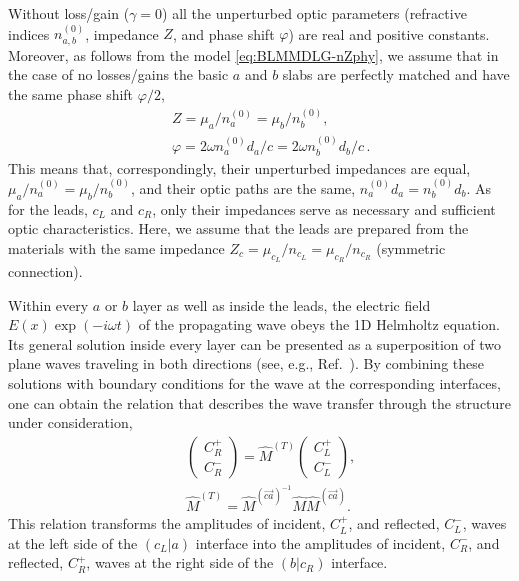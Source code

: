 \documentclass[aps,pra,reprint,showpacs,bibnotes,preprintnumbers,twoside,eqsecnum]{revtex4-1}
\begin{document}
Without loss/gain ($\gamma=0$) all the unperturbed optic parameters (refractive indices $n_{a,b}^{(0)}$, impedance $Z$, and phase shift $\varphi$) are real and positive constants. Moreover, as follows from the model \eqref{eq:BLMMDLG-nZphy}, we assume that in the case of no losses/gains the basic $a$ and $b$ slabs are perfectly matched and have the same phase shift $\varphi/2$,
%
\begin{subequations}\label{eq:MQS-def}
\begin{eqnarray}
&&Z=\mu_a/n_a^{(0)}=\mu_b/n_b^{(0)},\qquad\label{eq:MQS-Z}\\[6pt]
&&\varphi=2\omega n_a^{(0)}d_a/c=2\omega n_b^{(0)}d_b/c\,.\label{eq:MQS-phi}
\end{eqnarray}
\end{subequations}
This means that, correspondingly, their unperturbed impedances are equal, $\mu_a/n_a^{(0)}=\mu_b/n_b^{(0)}$, and their optic paths are the same, $n_a^{(0)}d_a=n_b^{(0)}d_b$. As for the leads, $c_L$ and $c_R$, only their impedances serve as necessary and sufficient optic characteristics. Here, we assume that the leads are prepared from the materials with the same impedance $Z_{c}=\mu_{c_L}/n_{c_L}=\mu_{c_R}/n_{c_R}$ (symmetric connection).

Within every $a$ or $b$ layer as well as inside the leads, the electric field $E(x)\exp(-i\omega t)$ of the propagating wave obeys the 1D Helmholtz equation. Its general solution inside every layer can be presented as a superposition of two plane waves traveling in both directions (see, e.g., Ref.~\cite{IKM12}). By combining these solutions with boundary conditions for the wave at the corresponding interfaces, one can obtain the relation that describes the wave transfer through the structure under consideration,
%
\begin{eqnarray}\label{eq:TotalTransfer}
&&\left(\begin{array}{c}C^{+}_{R}\\C^{-}_{R}\end{array}\right)=\hat{M}^{(T)}\left(\begin{array}{c}C^{+}_{L}\\C^{-}_{L}\end{array}\right),\nonumber\\[6pt]
&&\hat{M}^{(T)}=\hat{M}^{(\overrightarrow{ca})^{-1}}\hat{M}\hat{M}^{(\overrightarrow{ca})}.
\end{eqnarray}
This relation transforms the amplitudes of incident, $C^{+}_{L}$, and reflected, $C^{-}_{L}$, waves at the left side of the $(c_L|a)$ interface into the amplitudes of incident, $C^{-}_{R}$, and reflected, $C^{+}_{R}$, waves at the right side of the $(b|c_R)$ interface.
\end{document}
